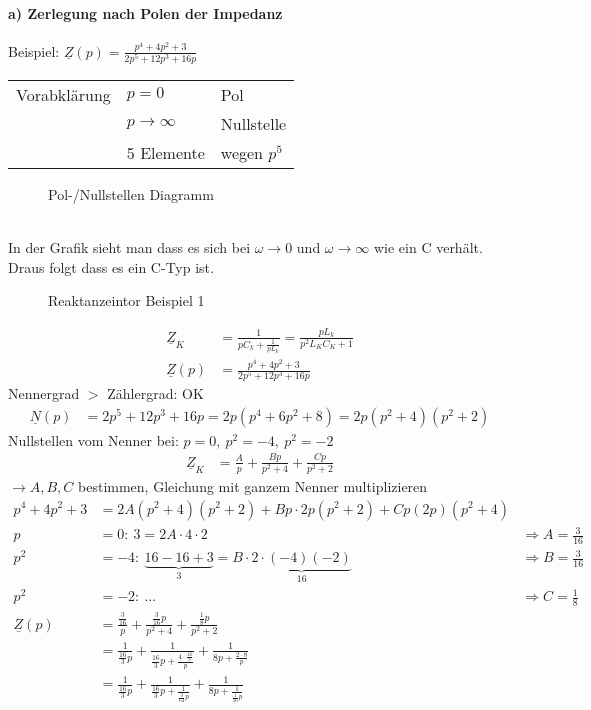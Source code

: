 \paragraph{a) Zerlegung nach Polen der Impedanz}
Beispiel: $\underline{Z}(p) = \frac{p^4+4p^2+3}{2p^5+12p^3+16p}$\\
\begin{tabular}{lll}
	Vorabklärung & $p=0$ & Pol \\
	& $p \rightarrow \infty$ & Nullstelle \\
	& 5 Elemente & wegen $p^5$ \\
\end{tabular}
\begin{figure}[!h]
	\centering
	
	\caption{Pol-/Nullstellen Diagramm}
	\label{fig:RetPolNullstelle}
\end{figure}\\
In der Grafik sieht man dass es sich bei $\omega \rightarrow 0$ und $\omega
\rightarrow \infty$ wie ein C verhält. Draus folgt dass es ein C-Typ ist.\\
\begin{figure}[!h]
	\centering
	
	\caption{Reaktanzeintor Beispiel 1}
	\label{fig:RetSyntheseBsp1S}
\end{figure}
\begin{align}
\underline{Z}_K&=\frac{1}{pC_k+\frac{1}{pL_k}} =
\frac{pL_k}{p^2L_KC_K+1}\nonumber\\
\underline{Z}(p)&=\frac{p^4+4p^2+3}{2p^5+12p^3+16p}\nonumber
\end{align}
Nennergrad $>$ Zählergrad: OK\\
\begin{align}
\underline{N}(p)&=2p^5+12p^3+16p=2p\left(p^4+6p^2+8\right)=2p\left(p^2+4\right)\left(p^2+2\right)\nonumber
\end{align}
Nullstellen vom Nenner bei: $p=0,\ p^2=-4,\ p^2=-2$\\
\begin{align}
\underline{Z}_K&=\frac{A}{p}+\frac{Bp}{p^2+4}+\frac{Cp}{p^2+2}\nonumber
\end{align}
$\rightarrow A,B,C$ bestimmen, Gleichung mit ganzem Nenner multiplizieren\\
\begin{align}
p^4+4p^2+3&=2A(p^2+4)(p^2+2)+Bp\cdot 2p(p^2+2)+Cp(2p)(p^2+4)\nonumber\\
p&=0:\ 3=2A\cdot 4 \cdot 2 &\Rightarrow A=\frac{3}{16}\nonumber\\
p^2&=-4:\ \underbrace{16-16+3}_{3}=B\cdot \underbrace{2\cdot (-4)(-2)}_{16}
&\Rightarrow B=\frac{3}{16}\nonumber\\ 
p^2&=-2:\ ... &\Rightarrow C=\frac{1}{8}\nonumber\\
\underline{Z}(p)&=\frac{\frac{3}{16}}{p}+\frac{\frac{3}{16}p}{p^2+4}+\frac{\frac{1}{8}p}{p^2+2}\nonumber\\
&=\frac{1}{\frac{16}{3}p}+\frac{1}{\frac{16}{3}p+\frac{4\cdot\frac{16}{3}}{p}}+\frac{1}{8p+\frac{2\cdot8}{p}}\nonumber\\
&=\frac{1}{\frac{16}{3}p}+\frac{1}{\frac{16}{3}p+\frac{1}{\frac{3}{64}p}}+\frac{1}{8p+\frac{1}{\frac{1}{16}p}}\nonumber
\end{align}

